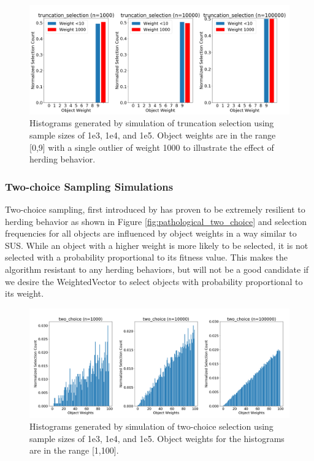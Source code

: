 \documentclass[12pt]{article}
\begin{document}
    \begin{figure}[h]
      \centering
      \includegraphics[scale=0.30]{images/pathological_truncation.png} 
      \caption{Histograms generated by simulation of truncation selection
               using sample sizes of 1e3, 1e4, and 1e5. Object weights are in
               the range [0,9] with a single outlier of weight 1000 to
               illustrate the effect of herding behavior.}
      \label{fig:pathological_truncation}
    \end{figure}

    \subsubsection{Two-choice Sampling Simulations}
    Two-choice sampling, first introduced by %
    has proven to be extremely resilient to herding behavior as shown in
    Figure \ref{fig:pathological_two_choice} and selection frequencies for all
    objects are influenced by object weights in a way similar to SUS. While an
    object with a higher weight is more likely to be selected, it is not
    selected with a probability proportional to its fitness value. This makes
    the algorithm resistant to any herding behaviors, but will not be a good
    candidate if we desire the WeightedVector to select objects with
    probability proportional to its weight.

    \begin{figure}[h]
      \centering
      \includegraphics[scale=0.30]{images/herding_two_choice.png} 
      \caption{Histograms generated by simulation of two-choice selection
               using sample sizes of 1e3, 1e4, and 1e5. Object weights
               for the histograms are in the range [1,100].}
      \label{fig:herding_two_choice}
    \end{figure}
\end{document}

